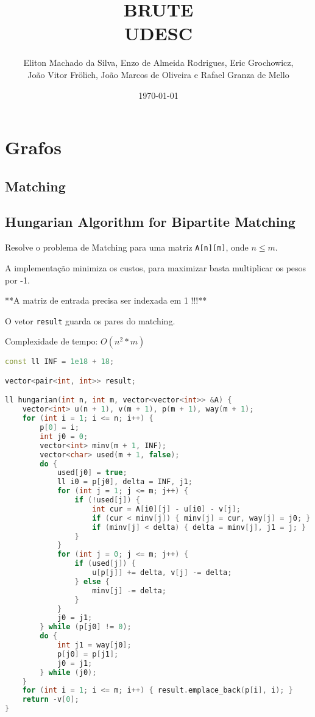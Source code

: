 \documentclass[11pt, a4paper, twoside]{article}
\title{BRUTE \\ UDESC}
\author{Eliton Machado da Silva, Enzo de Almeida Rodrigues, Eric Grochowicz, \\ João Vitor Frölich, João Marcos de Oliveira e Rafael Granza de Mello}
\begin{document}
\date{\today}
\maketitle


\renewcommand{\contentsname}{Índice} %
\tableofcontents
\newpage
%
%
%
%

\section{Grafos}

\subsection{Matching}

\subsection{Hungarian Algorithm for Bipartite Matching}


Resolve o problema de Matching para uma matriz \lstinline{A[n][m]}, onde $n \leq m$.

A implementação minimiza os custos, para maximizar basta multiplicar os pesos por -1.

**A matriz de entrada precisa ser indexada em 1 !!!**

O vetor \lstinline{result} guarda os pares do matching.

Complexidade de tempo: $O(n^2 * m)$

\begin{lstlisting}[language=C++]
const ll INF = 1e18 + 18;

vector<pair<int, int>> result;

ll hungarian(int n, int m, vector<vector<int>> &A) {
    vector<int> u(n + 1), v(m + 1), p(m + 1), way(m + 1);
    for (int i = 1; i <= n; i++) {
        p[0] = i;
        int j0 = 0;
        vector<int> minv(m + 1, INF);
        vector<char> used(m + 1, false);
        do {
            used[j0] = true;
            ll i0 = p[j0], delta = INF, j1;
            for (int j = 1; j <= m; j++) {
                if (!used[j]) {
                    int cur = A[i0][j] - u[i0] - v[j];
                    if (cur < minv[j]) { minv[j] = cur, way[j] = j0; }
                    if (minv[j] < delta) { delta = minv[j], j1 = j; }
                }
            }
            for (int j = 0; j <= m; j++) {
                if (used[j]) {
                    u[p[j]] += delta, v[j] -= delta;
                } else {
                    minv[j] -= delta;
                }
            }
            j0 = j1;
        } while (p[j0] != 0);
        do {
            int j1 = way[j0];
            p[j0] = p[j1];
            j0 = j1;
        } while (j0);
    }
    for (int i = 1; i <= m; i++) { result.emplace_back(p[i], i); }
    return -v[0];
}
\end{lstlisting}
\end{document}
